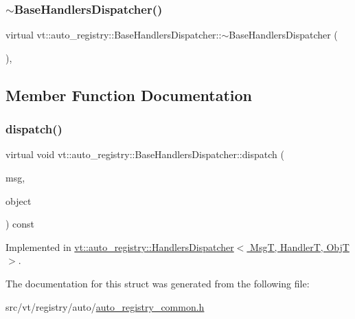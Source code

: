 \subsubsection{\texorpdfstring{$\sim$\+Base\+Handlers\+Dispatcher()}{~BaseHandlersDispatcher()}}
{\footnotesize\ttfamily virtual vt\+::auto\+\_\+registry\+::\+Base\+Handlers\+Dispatcher\+::$\sim$\+Base\+Handlers\+Dispatcher (\begin{DoxyParamCaption}{ }\end{DoxyParamCaption})\hspace{0.3cm}{\ttfamily [virtual]}, {\ttfamily [default]}}



\subsection{Member Function Documentation}
\mbox{\label{structvt_1_1auto__registry_1_1_base_handlers_dispatcher_af31a57d118de940836c3b8ea28b4a0d3}} 
\subsubsection{\texorpdfstring{dispatch()}{dispatch()}}
{\footnotesize\ttfamily virtual void vt\+::auto\+\_\+registry\+::\+Base\+Handlers\+Dispatcher\+::dispatch (\begin{DoxyParamCaption}\item[{\hyperlink{structvt_1_1messaging_1_1_base_msg}{messaging\+::\+Base\+Msg} $\ast$}]{msg,  }\item[{std\+::byte $\ast$}]{object }\end{DoxyParamCaption}) const\hspace{0.3cm}{\ttfamily [pure virtual]}}



Implemented in \hyperlink{structvt_1_1auto__registry_1_1_handlers_dispatcher_a2011677dbfc1c7f8425066c4311c53ce}{vt\+::auto\+\_\+registry\+::\+Handlers\+Dispatcher$<$ Msg\+T, Handler\+T, Obj\+T $>$}.



The documentation for this struct was generated from the following file\+:\begin{DoxyCompactItemize}
\item 
src/vt/registry/auto/\hyperlink{auto__registry__common_8h}{auto\+\_\+registry\+\_\+common.\+h}\end{DoxyCompactItemize}
